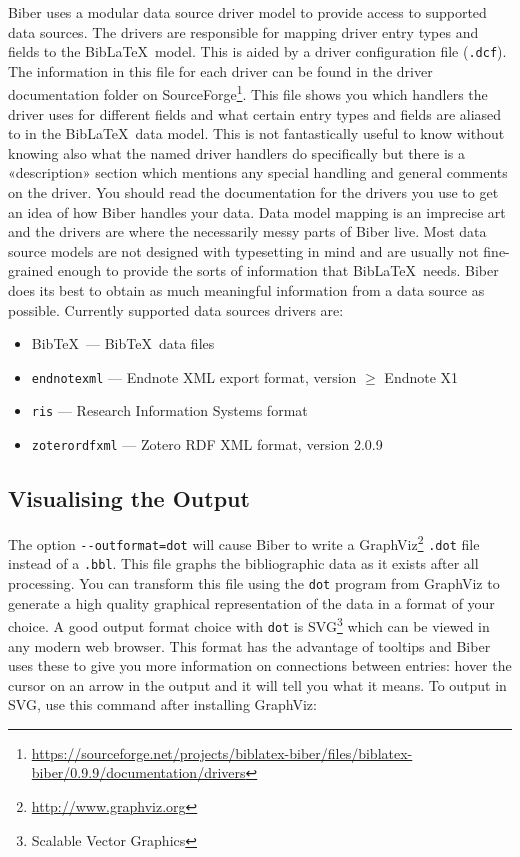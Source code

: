 \documentclass{ltxdockit}
\gdef\biberversion{0.9.9}    %
\begin{document}
Biber uses a modular data source driver model to provide access
to supported data sources. The drivers are responsible for mapping
driver entry types and fields to the Bib\LaTeX\ model. This is
aided by a driver configuration file (\verb+.dcf+). The information in
this file for each driver can be found in the driver documentation folder on
SourceForge\footnote{\url{https://sourceforge.net/projects/biblatex-biber/files/biblatex-biber/\biberversion/documentation/drivers}}. This
file shows you which handlers the driver uses for different fields and
what certain entry types and fields are aliased to in the
Bib\LaTeX\ data model. This is not fantastically useful to know
without knowing also what the named driver handlers do specifically but there
is a «description» section which mentions any special handling and
general comments on the driver. You should read the documentation for
the drivers you use to get an idea of how Biber handles your
data. Data model mapping is an imprecise art
and the drivers are where the necessarily messy parts of Biber
live. Most data source models are not designed with typesetting in
mind and are usually not fine-grained enough to provide the sorts of
information that Bib\LaTeX\ needs. Biber does its best to
obtain as much meaningful information from a data source as possible.
Currently supported data sources drivers are:

\begin{itemize}
\item Bib\TeX\ --- Bib\TeX\ data files
\item \verb+endnotexml+ --- Endnote XML export format, version $\geq$ Endnote X1
\item \verb+ris+ --- Research Information Systems format
\item \verb+zoterordfxml+ --- Zotero RDF XML format, version 2.0.9
\end{itemize}

\subsection{Visualising the Output}\label{vis}

The option \verb+--outformat=dot+ will cause Biber to write a
GraphViz\footnote{\url{http://www.graphviz.org}} \verb+.dot+ file instead
of a \verb+.bbl+. This file graphs the bibliographic data as it exists
after all processing. You can transform this file using the \verb+dot+
program from GraphViz to generate a high quality graphical representation
of the data in a format of your choice. A good output format choice with
\verb+dot+ is SVG\footnote{Scalable Vector Graphics} which can be viewed in
any modern web browser. This format has the advantage of tooltips and Biber
uses these to give you more information on connections between entries:
hover the cursor on an arrow in the output and it will tell you what it
means. To output in SVG, use this command after installing GraphViz:
\end{document}
